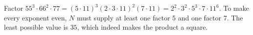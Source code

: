 Factor $55^3\cdot66^2\cdot77=(5\cdot11)^3(2\cdot3\cdot11)^2(7\cdot11)=2^2\cdot3^2\cdot5^3\cdot7\cdot11^6$. To make every exponent even, $N$ must supply at least one factor 5 and one factor 7. The least possible value is $\boxed{35}$, which indeed makes the product a square.
